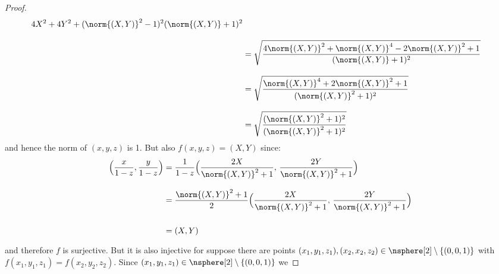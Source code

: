 \begin{proof}
\begin{subequations}
\begin{align}
{{                                4X^{2}+4Y^{2}+(\norm{(X,Y)}^{2}-1)^{2}%
                            }{%
                                (\norm{(X,Y)}+1)^{2}%
                            }
                        }\\[2ex]
                        &=\sqrt{%
                        \frac{%
                            4\norm{(X,Y)}^{2}+
                            \norm{(X,Y)}^{4}-
                            2\norm{(X,Y)}^{2}+1%
                        }{%
                            (\norm{(X,Y)}+1)^{2}%
                        }%
                    }\\[2ex]
                    &=\sqrt{%
                        \frac{%
                            \norm{(X,Y)}^{4}+2\norm{(X,Y)}^{2}+1%
                        }{%
                            (\norm{(X,Y)}^{2}+1)^{2}%
                        }%
                    }\\[2ex]
                    &=\sqrt{%
                        \frac{(\norm{(X,Y)}^{2}+1)^{2}}
                             {(\norm{(X,Y)}^{2}+1)^{2}}%
                    }
                \end{align}
            \end{subequations}
            and hence the norm of $(x,y,z)$ is 1. But also
            $f(x,y,z)=(X,Y)$ since:
            \begin{subequations}
                \begin{align}
                    \Big(\frac{x}{1-z},\frac{y}{1-z}\Big)
                        &=\frac{1}{1-z}\Big(%
                            \frac{2X}{\norm{(X,Y)}^{2}+1},\,
                            \frac{2Y}{\norm{(X,Y)}^{2}+1}%
                        \Big)\\[2ex]
                    &=\frac{\norm{(X,Y)}^{2}+1}{2}
                        \Big(%
                            \frac{2X}{\norm{(X,Y)}^{2}+1},\,
                            \frac{2Y}{\norm{(X,Y)}^{2}+1}%
                        \Big)\\[2ex]
                    &=(X,Y)\vphantom{\Big(\frac{X}{Y})}
                \end{align}
            \end{subequations}
            and therefore $f$ is surjective. But it is also injective
            for suppose there are points
            $(x_{1},y_{1},z_{1}),(x_{2},x_{2},z_{2})\in%
            \nsphere[2]\setminus\{(0,0,1)\}$ with
            $f(x_{1},y_{1},z_{1})=f(x_{2},y_{2},z_{2})$. Since
            $(x_{1},y_{1},z_{1})\in\nsphere[2]\setminus\{(0,0,1)\}$ we

\end{proof}
